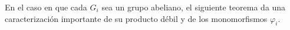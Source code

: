 \documentclass[12pt]{report}
\theoremstyle{largebreak}
\begin{document}
    En el caso en que cada $G_i$ sea un grupo abeliano, el siguiente teorema da una caracterización importante de su producto débil y de los monomorfismos $\varphi_i$.

    \begin{theor}
        
    \end{theor}
\end{document}
